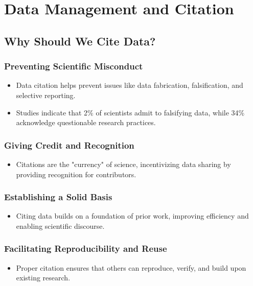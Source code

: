 \section{Data Management and Citation}

\subsection{Why Should We Cite Data?}
\subsubsection{Preventing Scientific Misconduct}
\begin{itemize}
    \item Data citation helps prevent issues like data fabrication, falsification, and selective reporting.
    \item Studies indicate that 2\% of scientists admit to falsifying data, while 34\% acknowledge questionable research practices.
\end{itemize}

\subsubsection{Giving Credit and Recognition}
\begin{itemize}
    \item Citations are the "currency" of science, incentivizing data sharing by providing recognition for contributors.
\end{itemize}

\subsubsection{Establishing a Solid Basis}
\begin{itemize}
    \item Citing data builds on a foundation of prior work, improving efficiency and enabling scientific discourse.
\end{itemize}

\subsubsection{Facilitating Reproducibility and Reuse}
\begin{itemize}
    \item Proper citation ensures that others can reproduce, verify, and build upon existing research.
\end{itemize}

